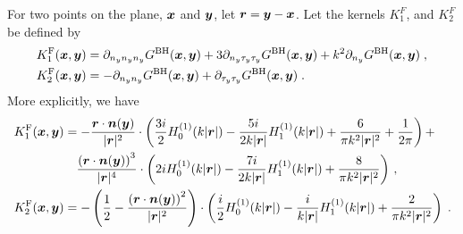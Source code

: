 For two points on the plane, $\xx$ and $\yy$, let $\br = \yy - \xx$. Let the kernels $K_{1}^{F}$, and 
$K_{2}^{F}$ be defined by 
\begin{align}
  \Kfark_1(\xx,\yy) &= \partial_{n_{y}n_{y}n_{y}}\Gbh(\xx,\yy)
  + 3 \partial_{n_{y}\tau_{y}\tau_{y}}\Gbh(\xx,\yy) + k^{2} \partial_{n_{y}}\Gbh(\xx,\yy)\; , \label{eq:kf1} \\
  \Kfark_2(\xx,\yy) &= -\partial_{n_{y}n_{y}}\Gbh(\xx,\yy)
  + \partial_{\tau_{y}\tau_{y}}\Gbh(\xx,\yy) \label{eq:kf2} \; .
\end{align}
More explicitly, we have
\begin{align}
  \Kfark_1(\xx,\yy) &=  -\dfrac{\br \cdot \bn(\yy)}{|\br|^2}  \cdot \left( \frac{3 i}{2} H_0^{(1)}(k|\br|) - \frac{5 i}{2 k|\br|} H_1^{(1)}(k|\br|) + \frac{6}{\pi k^2 |\br|^2} + \frac{1}{2\pi}  \right) +     \\
  & \quad \dfrac{\left(\br \cdot \bn(\yy)\right)^3}{|\br|^4} \cdot \left( 2i H_0^{(1)}(k|\br|) - \frac{7 i}{2 k|\br|} H_1^{(1)}(k|\br|) + \frac{8}{\pi k^2 |\br|^2}  \right) \, , \nonumber \\
  \Kfark_2(\xx,\yy) &=  -\left(\frac{1}{2}-\dfrac{\left(\br \cdot \bn(\yy)\right)^2}{|\br|^2} \right)  \cdot \left( \frac{i}{2} H_0^{(1)}(k|\br|) - \frac{i}{k|\br|} H_1^{(1)}(k|\br|) + \frac{2}{\pi k^2 |\br|^2}  \right)\; .
\end{align}

